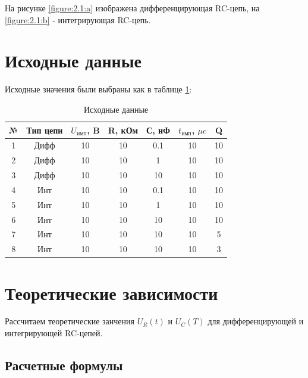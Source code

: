 На рисунке \ref{figure:2.1:a} изображена дифференцирующая RC-цепь, на \ref{figure:2.1:b} - интегрирующая RC-цепь.


\section{Исходные данные}

Исходные значения были выбраны как в таблице \ref{tab:3:1}:

\begin{table}[H]
	\begin{center}
	\caption{Исходные данные}
	\def\arraystretch{1.5}
		\begin{tabular}{|c|c|c|c|c|c|c|}
			\hline 
			№ & Тип цепи & $U_\text{имп}$, B & R, кОм & С, нФ & $t_\text{имп}$, $\mu c$ & Q\\ 
			\hline 
			1 & Дифф & 10 & 10 & 0.1 & 10 & 10\\ 
			\hline 
			2 & Дифф & 10 & 10 & 1 & 10 & 10\\ 
			\hline 
			3 & Дифф & 10 & 10 & 10 & 10 & 10\\ 
			\hline 
			4 & Инт & 10 & 10 & 0.1 & 10 & 10\\ 
			\hline 
			5 & Инт & 10 & 10 & 1 & 10 & 10\\ 
			\hline 
			6 & Инт & 10 & 10 & 10 & 10 & 10\\
			\hline 
			7 & Инт & 10 & 10 & 10 & 10 & 5\\ 
			\hline 
			8 & Инт & 10 & 10 & 10 & 10 & 3\\ 
			\hline
		\end{tabular}
		\label{tab:3:1}
	\end{center}
\end{table}

\section{Теоретические зависимости}

Рассчитаем теоретические занчения $U_R(t)$ и $U_C(T)$ для дифференцирующей и интегрирующей RC-цепей.

\subsection{Расчетные формулы}


